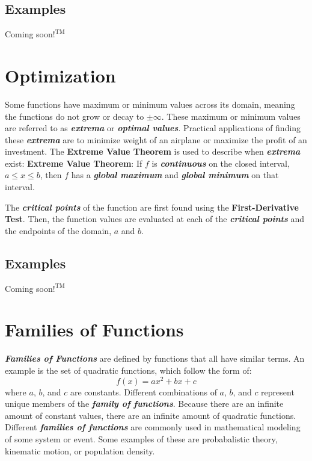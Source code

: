 \begin{center}
\section*{\small Examples}
Coming soon$!^{\text{TM}}$
\end{center}

\section{Optimization}
Some functions have maximum or minimum values across its domain, meaning the functions do not grow or decay to $\pm\infty$. These maximum or minimum values are referred to as \textbf{\textit{extrema}} or \textbf{\textit{optimal values}}. Practical applications of finding these \textbf{\textit{extrema}} are to minimize weight of an airplane or maximize the profit of an investment. The \textbf{Extreme Value Theorem} is used to describe when \textbf{\textit{extrema}} exist:
\vspace{0.1in}
\textbf{Extreme Value Theorem}: If $f$ is \textbf{\textit{continuous}} on the closed interval, $a \leq x \leq b$, then $f$ has a \textbf{\textit{global maximum}} and \textbf{\textit{global minimum}} on that interval.

\vspace{0.1in}
The \textbf{\textit{critical points}} of the function are first found using the \textbf{First-Derivative Test}. Then, the function values are evaluated at each of the \textbf{\textit{critical points}} and the endpoints of the domain, $a$ and $b$.

\begin{center}
\section*{\small Examples}
Coming soon$!^{\text{TM}}$
\end{center}

\section{Families of Functions}
\textbf{\textit{Families of Functions}} are defined by functions that all have similar terms. An example is the set of quadratic functions, which follow the form of:
%
\begin{equation}
f(x) = ax^2 + bx + c
\end{equation}
%
where $a$, $b$, and $c$ are constants. Different combinations of $a$, $b$, and $c$ represent unique members of the \textbf{\textit{family of functions}}. Because there are an infinite amount of constant values, there are an infinite amount of quadratic functions. Different \textbf{\textit{families of functions}} are commonly used in mathematical modeling of some system or event. Some examples of these are probabalistic theory, kinematic motion, or population density.

